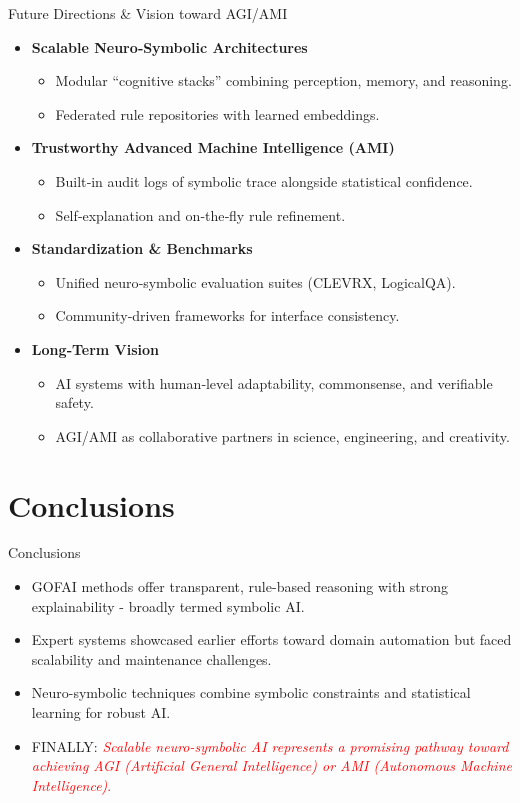 \documentclass[german,10pt]{beamer}
\begin{document}
\begin{frame}{Future Directions \& Vision toward AGI/AMI}
  \begin{itemize}
    \item \textbf{Scalable Neuro‑Symbolic Architectures}  
      \begin{itemize}
        \item Modular “cognitive stacks” combining perception, memory, and reasoning.  
        \item Federated rule repositories with learned embeddings.
      \end{itemize}
    \item \textbf{Trustworthy Advanced Machine Intelligence (AMI) }  
      \begin{itemize}
        \item Built‐in audit logs of symbolic trace alongside statistical confidence.  
        \item Self‑explanation and on‑the‑fly rule refinement.
      \end{itemize}
    \item \textbf{Standardization \& Benchmarks}  
      \begin{itemize}
        \item Unified neuro‑symbolic evaluation suites (CLEVRX, LogicalQA).  
        \item Community‐driven frameworks for interface consistency.
      \end{itemize}
    \item \textbf{Long‑Term Vision}  
      \begin{itemize}
        \item AI systems with human‑level adaptability, commonsense, and verifiable safety.  
        \item AGI/AMI as collaborative partners in science, engineering, and creativity.
      \end{itemize}
  \end{itemize}
\end{frame}

\section{Conclusions}
\begin{frame}{Conclusions }
  \begin{itemize}
    \item GOFAI methods offer transparent, rule-based reasoning with strong explainability - broadly termed symbolic AI.
    \item Expert systems showcased earlier efforts toward domain automation but faced scalability and maintenance challenges.
    \item Neuro-symbolic techniques combine symbolic constraints and statistical learning for robust AI.
    \item FINALLY: \textcolor{red}{\textit{Scalable neuro-symbolic AI represents a promising pathway toward achieving AGI (Artificial General Intelligence) or AMI (Autonomous Machine Intelligence)}.}
  \end{itemize}
\end{frame}
\end{document}
